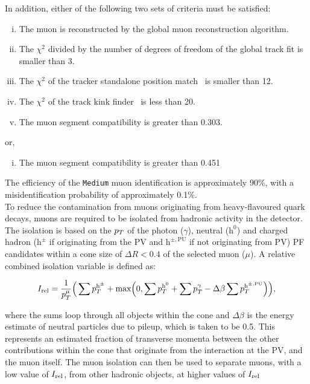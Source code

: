 In addition, either of the following two sets of criteria must be satisfied:

\begin{enumerate}[i)]
\item The muon is reconstructed by the global muon reconstruction algorithm.
\item The $\chi^2$ divided by the number of degrees of freedom of the global track fit is smaller than 3.
\item The $\chi^2$ of the tracker standalone position match~\cite{CMS:2009fdy} is smaller than 12.
\item The $\chi^2$ of the track kink finder~\cite{CMS:2018rym} is less than 20.
\item The muon segment compatibility is greater than 0.303.
\end{enumerate}

or,

\begin{enumerate}[i)]
\item The muon segment compatibility is greater than 0.451 
\end{enumerate}

The efficiency of the \texttt{Medium} muon identification is approximately 90\%, with a misidentification probability of approximately 0.1\%. \\

To reduce the contamination from muons originating from heavy-flavoured quark decays, muons are required to be isolated from hadronic activity in the detector. 
The isolation is based on the $p_{T}$ of the photon ($\gamma$), neutral ($\text{h}^0$) and charged hadron ($\text{h}^{\pm}$ if originating from the \ac{PV} and $\text{h}^{\pm,\text{PU}}$ if not originating from \ac{PV}) \ac{PF} candidates within a cone size of $\Delta R<0.4$ of the selected muon ($\mu$). 
A relative combined isolation variable is defined as:

\begin{equation}
\label{eqn:reliso}
I_{\text{rel}} = \frac{1}{p_{T}^{\mu}} \Big( \sum p_{T}^{\text{h}^{\pm}} + \text{max}\Big( 0, \sum p_{T}^{\text{h}^0} + \sum p_{T}^{\gamma} - \Delta \beta \sum p_{T}^{\text{h}^{\pm, \text{PU}}} \Big) \Big),
\end{equation}

where the sums loop through all objects within the cone and $\Delta \beta$ is the energy estimate of neutral particles due to pileup, which is taken to be 0.5.
This represents an estimated fraction of transverse momenta between the other contributions within the cone that originate from the interaction at the \ac{PV}, and the muon itself.
The muon isolation can then be used to separate muons, with a low value of $I_{\text{rel}}$, from other hadronic objects, at higher values of $I_{\text{rel}}$

